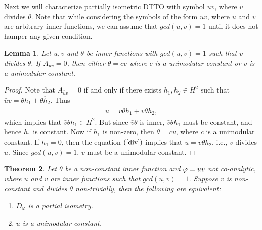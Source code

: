 \documentclass[12pt]{amsart}
\theoremstyle{definition}
\theoremstyle{plain}
\newtheorem{thm}{Theorem}[section]
\newtheorem{lem}[thm]{Lemma}
\theoremstyle{definition}
\numberwithin{equation}{section}
\let\phi=\varphi
\begin{document}
Next we will characterize partially isometric DTTO with symbol $\bar{u}v$, where $v$ divides $\theta$. Note that while considering the symbols of the form $\bar{u}v$, where $u$ and $v$ are arbitrary inner functions, we can assume that $gcd(u,v)=1$ until it does not hamper any given condition.
	
\begin{lem}\label{lemma for zero case}
Let $u, v$ and $\theta$ be inner functions with $gcd(u,v)=1$ such that $v$ divides 
$\theta$. If $A_{\bar{u}v} = 0$, then either $\theta=cv$ where $c$ is a unimodular constant or $v$ is a unimodular constant.
\end{lem}
	
	
	
\begin{proof}
Note that $A_{\bar{u}v} = 0$ if and only if there exists $h_1, h_2 \in H^2$ 
such that $\bar{u}v =\theta h_1 +\overline{\theta h_2}$. Thus
\begin{align}\label{div}
\bar{u}=\bar{v} \theta h_1 + \overline{ v\theta h_2},
\end{align}
which implies that $\bar{v}\theta h_1 \in \overline{H^2}$. But since $\bar{v}\theta$ is inner, $\bar{v}\theta h_1$ must be constant, and hence $h_1$ is constant. Now if $h_1$ 
is non-zero, then $\theta=cv$, where $c$ is a unimodular constant. If $h_1=0$, then the equation $(\ref{div})$ implies that $u=v \theta h_2$, i.e., $v$ divides $u$. Since $gcd (u,v)=1$, $v$ must be a unimodular constant. 
\end{proof}
	
	
	
	
\begin{thm}\label{vdividestheta}
Let $\theta$ be a non-constant inner function and $\phi=\Bar{u}v$ not co-analytic, where $u$ and $v$ are inner functions such that $gcd(u,v)=1$. Suppose $v$ is non-constant and divides $\theta$ non-trivially, then the following are equivalent:
\begin{enumerate}
			\item $D_{\phi}$ is a partial isometry.
			\item $u$ is a unimodular constant.			
\end{enumerate}  
\end{thm}
	
	
	
\end{document}
